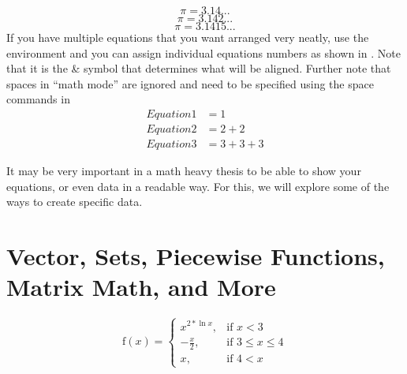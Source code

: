 
	\begin{equation}
		\label{eq:Eq}
		\pi = 3.14...
	\end{equation}
	\begin{equation*}
		\tag{Constant pi}\label{eq:pi}
		\pi = 3.142...
	\end{equation*}
	\begin{equation*}
		\tag*{Constant pi}\label{eq:otherpi}
		\pi = 3.1415...
	\end{equation*}
	If you have multiple equations that you want arranged very neatly, use the  environment and you can assign individual equations numbers as shown in .
	Note that it is the \& symbol that determines what will be aligned.
	Further note that spaces in \enquote{math mode} are ignored and need to be specified using the space commands in %
	\begin{align}%
		\label{eq:multiref:a} Equation1 &= 1\\
		\label{eq:multiref:b} Equation2 &= 2 + 2\\
		\label{eq:multiref:c} Equation3 &= 3 + 3 + 3
	\end{align}
	
	
	
	
	
	It may be very important in a math heavy thesis to be able to show your equations, or even data in a readable way. 
	For this, we will explore some of the ways to create specific data.

	\section{Vector, Sets, Piecewise Functions, Matrix Math, and More}
		\begin{equation}
			\text{f}(x) = 
				\begin{cases}
					x^{2*\ln{x}},&\text{if }x<3\\
					-\frac{x}{2},&\text{if }3\leq{}x\leq{}4\\
					x,&\text{if }4<x
				\end{cases}
		\end{equation}
	
